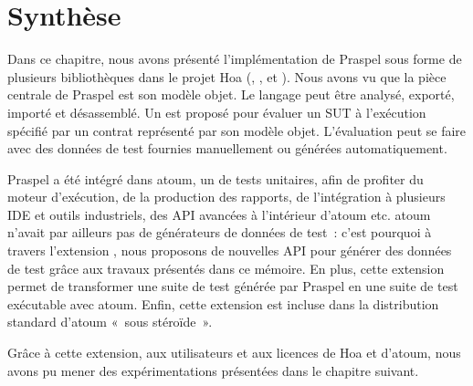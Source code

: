 \section{Synthèse}
\label{section:tools:summary}

Dans ce chapitre, nous avons présenté l'implémentation de Praspel sous forme de
plusieurs bibliothèques dans le projet Hoa (,
,  et
). Nous avons vu que la pièce centrale de Praspel est
son modèle objet. Le langage peut être analysé, exporté, importé et désassemblé.
Un  est proposé pour évaluer un SUT à
l'exécution spécifié par un contrat représenté par son modèle objet.
L'évaluation peut se faire avec des données de test fournies manuellement ou
générées automatiquement.

Praspel a été intégré dans atoum, un  de tests unitaires,
afin de profiter du moteur d'exécution, de la production des rapports, de
l'intégration à plusieurs IDE et outils industriels, des API avancées à
l'intérieur d'atoum etc. atoum n'avait par ailleurs pas de générateurs de
données de test~: c'est pourquoi à travers l'extension
, nous proposons de nouvelles API pour
générer des données de test grâce aux travaux présentés dans ce mémoire. En
plus, cette extension permet de transformer une suite de test générée par
Praspel en une suite de test exécutable avec atoum. Enfin, cette extension est
incluse dans la distribution standard d'atoum «~sous stéroïde~».

Grâce à cette extension, aux utilisateurs et aux licences
 de Hoa et d'atoum, nous avons pu mener des
expérimentations présentées dans le chapitre suivant.
